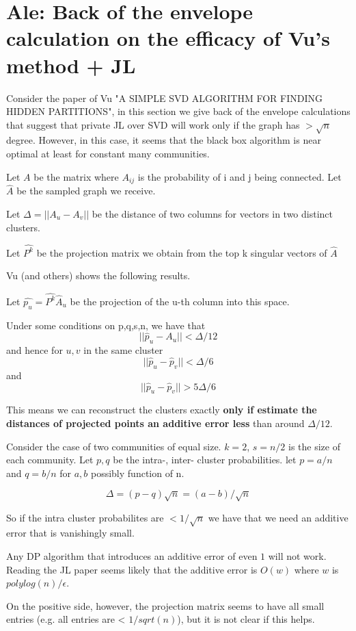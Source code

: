 
\section{Ale: Back of the envelope calculation on the efficacy of Vu's method + JL}

Consider the paper of Vu "A SIMPLE SVD ALGORITHM FOR FINDING HIDDEN PARTITIONS", in this section we give back of the envelope calculations that suggest that private JL over SVD will work only if the graph has $> \sqrt n$ degree. However, in this case, it seems that the black box algorithm is near optimal at least for constant many communities.  

Let $A$ be the matrix where $A_{ij}$ is the probability of i and j being connected. Let $\hat{A}$ be the sampled graph we receive.

Let $\Delta = ||A_u-A_v||$ be the distance of two columns for vectors in two distinct clusters. 

Let $\hat{P^k}$ be the projection matrix we obtain from the top k singular vectors of $\hat{A}$ 

Vu (and others) shows the following results.
\begin{fact}
Let $\hat{p_u} = \hat{P^k} \hat{A}_u$ be the projection of the u-th column into this space.

Under some conditions on p,q,s,n, we have that
$$||\hat{p}_u - A_u|| < \Delta / 12$$
and hence for $u,v$ in the same cluster
$$||\hat{p}_u - \hat{p}_v || < \Delta / 6$$
and
$$||\hat{p}_u - \hat{p}_v || > 5 \Delta  / 6$$
\end{fact}

This means we can reconstruct the clusters exactly \textbf{ only if estimate the distances of projected points an additive error less } than around $\Delta/12$.

Consider the case of two communities of equal size. $k=2$, $s=n/2$ is the size of each community. Let $p,q$ be the intra-, inter- cluster probabilities. let $p=a/n$ and $q=b/n$ for $a,b$ possibly function of n.

$$\Delta = (p-q)\sqrt{n} = (a-b)/\sqrt{n}$$

So if the intra cluster probabilites are $<1/\sqrt{n}$ we have that we need an additive error that is vanishingly small.  

Any DP algorithm that introduces an additive error of even $1$ will not work. Reading the JL paper seems likely that the additive error is $O(w)$ where $w$ is $polylog(n)/\epsilon$.


On the positive side, however, the projection matrix seems to have all small entries (e.g. all entries are < $1/sqrt(n)$), but it is not clear if this helps. 



